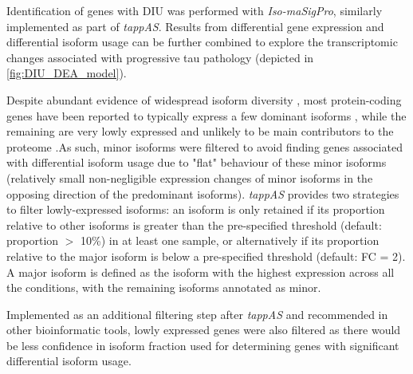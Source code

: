 Identification of genes with DIU was performed with \textit{Iso-maSigPro}\cite{Nueda2018}, similarly implemented as part of \textit{tappAS}. Results from differential gene expression and differential isoform usage can be further combined to explore the transcriptomic changes associated with progressive tau pathology (depicted in \cref{fig:DIU_DEA_model}).  

Despite abundant evidence of widespread isoform diversity \cite{Wang2008}, most protein-coding genes have been reported to typically express a few dominant isoforms \cite{Gonzalez-Porta2013, Ezkurdia2015}, while the remaining are very lowly expressed and unlikely to be main contributors to the proteome \cite{Gonzalez-Porta2013}.As such, minor isoforms were filtered to avoid finding genes associated with differential isoform usage due to "flat" behaviour of these minor isoforms \cite{DeLaFuente2020} (relatively small non-negligible expression changes of minor isoforms in the opposing direction of the predominant isoforms). \textit{tappAS} provides two strategies to filter lowly-expressed isoforms: an isoform is only retained if its proportion relative to other isoforms is greater than the pre-specified threshold (default: proportion $>$ 10\%) in at least one sample, or alternatively if its proportion relative to the major isoform is below a pre-specified threshold (default: FC = 2). A major isoform is defined as the isoform with the highest expression across all the conditions, with the remaining isoforms annotated as minor. 

Implemented as an additional filtering step after \textit{tappAS} and recommended in other bioinformatic tools\cite{Vitting-Seerup2017}, lowly expressed genes were also filtered as there would be less confidence in isoform fraction used for determining genes with significant differential isoform usage.  




